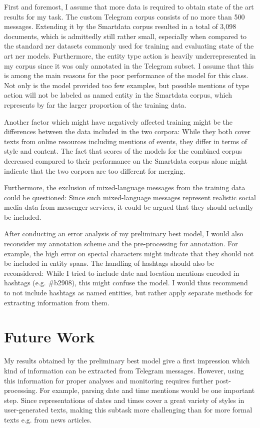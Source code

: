 First and foremost, I assume that more data is required to obtain state of the art results for my task. The custom Telegram corpus consists of no more than 500 messages. Extending it by the Smartdata corpus resulted in a total of 3,098 documents, which is admittedly still rather small, especially when compared to the standard \gls{ner} datasets commonly used for training and evaluating state of the art \gls{ner} models. 
Furthermore, the entity type action is heavily underrepresented in my corpus since it was only annotated in the Telegram subset. I assume that this is among the main reasons for the poor performance of the model for this class. Not only is the model provided too few examples, but possible mentions of type action will not be labeled as named entity in the Smartdata corpus, which represents by far the larger proportion of the training data. 

Another factor which might have negatively affected training might be the differences between the data included in the two corpora: While they both cover texts from online resources including mentions of events, they differ in terms of style and content.  The fact that scores of the models for the combined corpus decreased compared to their performance on the Smartdata corpus alone might indicate that the two corpora are too different for merging.

Furthermore, the exclusion of mixed-language messages from the training data could be questioned: Since such mixed-language messages represent realistic social media data from messenger services, it could be argued that they should actually be included. 

After conducting an error analysis of my preliminary best model, I would also reconsider my annotation scheme and the pre-processing for annotation. For example, the high error on special characters might indicate that they should not be included in entity spans. 
The handling of hashtags should also be reconsidered: While I tried to include date and location mentions encoded in hashtags (e.g. \#b2908), this might confuse the model. I would thus recommend to not include hashtags as named entities, but rather apply separate methods for extracting information from them. 

\section{Future Work}
My results obtained by the preliminary best model give a first impression which kind of information can be extracted from Telegram messages. However, using this information for proper analyses and monitoring requires further post-processing. 
For example, parsing date and time mentions would be one important step. Since representations of dates and times cover a great variety of styles in user-generated texts, making this subtask more challenging than for more formal texts e.g. from news articles. 

